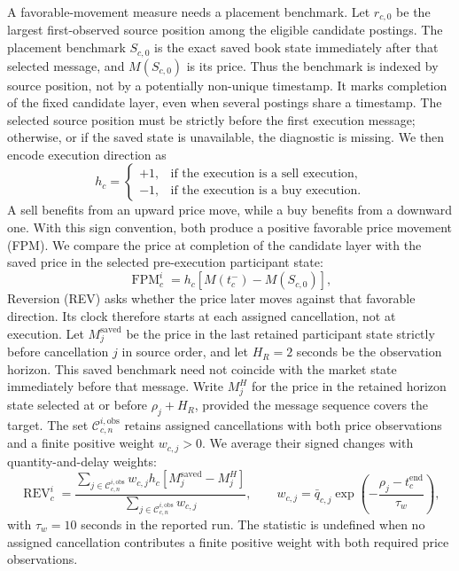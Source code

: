 \documentclass[11pt]{article}
\begin{document}
A favorable-movement measure needs a placement benchmark. Let $r_{c,0}$ be the largest first-observed source position among the eligible candidate postings. The placement benchmark $S_{c,0}$ is the exact saved book state immediately after that selected message, and $M(S_{c,0})$ is its price. Thus the benchmark is indexed by source position, not by a potentially non-unique timestamp. It marks completion of the fixed candidate layer, even when several postings share a timestamp. The selected source position must be strictly before the first execution message; otherwise, or if the saved state is unavailable, the diagnostic is missing. We then encode execution direction as
\begin{equation}
    h_c=
    \begin{cases}
        +1, & \text{if the execution is a sell execution,}\\
        -1, & \text{if the execution is a buy execution.}
    \end{cases}
    \label{eq:price_response_direction}
\end{equation}
A sell benefits from an upward price move, while a buy benefits from a downward one. With this sign convention, both produce a positive favorable price movement (FPM). We compare the price at completion of the candidate layer with the saved price in the selected pre-execution participant state:
\begin{equation}
    \operatorname{FPM}^{i}_{c}
    =
    h_c\left[M(t_c^{-})-M(S_{c,0})\right],
    \label{eq:favorable_price_move}
\end{equation}
Reversion (REV) asks whether the price later moves against that favorable direction. Its clock therefore starts at each assigned cancellation, not at execution. Let $M_j^{\mathrm{saved}}$ be the price in the last retained participant state strictly before cancellation $j$ in source order, and let $H_R=2$ seconds be the observation horizon. This saved benchmark need not coincide with the market state immediately before that message. Write $M_j^H$ for the price in the retained horizon state selected at or before $\rho_j+H_R$, provided the message sequence covers the target. The set $\mathcal{C}_{c,n}^{i,\mathrm{obs}}$ retains assigned cancellations with both price observations and a finite positive weight $w_{c,j}>0$. We average their signed changes with quantity-and-delay weights:
\begin{equation}
    \operatorname{REV}^{i}_{c}
    =
    \frac{
        \sum_{j\in\mathcal{C}_{c,n}^{i,\mathrm{obs}}}
        w_{c,j}h_c\left[M_j^{\mathrm{saved}}-M_j^H\right]
    }{
        \sum_{j\in\mathcal{C}_{c,n}^{i,\mathrm{obs}}} w_{c,j}
    },
    \qquad
    w_{c,j}=\bar q_{c,j}\exp\!\left(-\frac{\rho_j-t_c^{\mathrm{end}}}{\tau_w}\right),
    \label{eq:price_reversion}
\end{equation}
with $\tau_w=10$ seconds in the reported run. The statistic is undefined when no assigned cancellation
contributes a finite positive weight with both required price observations.
\end{document}
